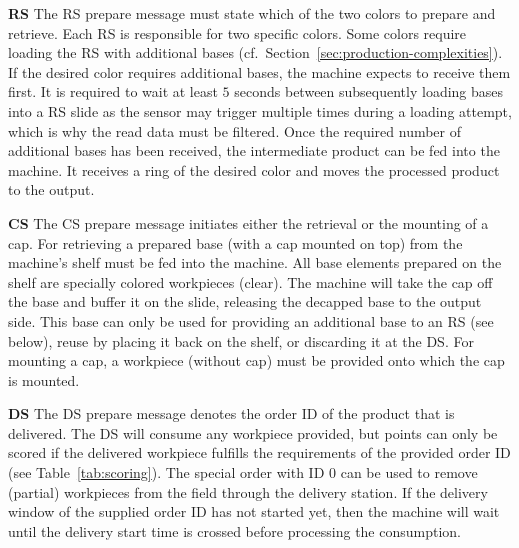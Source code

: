 \documentclass[12pt,twoside]{article}
\newcommand{\refsec}[1]{Section~\ref{#1}}
\newcommand{\reftab}[1]{Table~\ref{#1}}
\begin{document}
\noindent\textbf{\acl{RS}}
The \ac{RS} prepare message must state which of the two colors to prepare and
retrieve. Each \ac{RS} is responsible for two specific colors. Some colors
require loading the \ac{RS} with additional bases
(cf.~\refsec{sec:production-complexities}). If the desired color requires
additional bases, the machine expects to receive them first.
It is required to wait at least $5$ seconds between
subsequently loading bases into a \ac{RS} slide as the sensor may trigger
multiple times during a loading attempt, which is why the read data must be
filtered.
Once the required number of
additional bases has been received, the intermediate product can be
fed into the machine. It receives a ring of the desired color and
moves the processed product to the output.

\noindent\textbf{\acl{CS}}
The \ac{CS} prepare message initiates either the retrieval or the mounting of
a cap. For retrieving a prepared base (with a cap mounted on top) from
the machine's shelf must be fed into the machine. All base elements
prepared on the shelf are specially colored workpieces (clear). The
machine will take the cap off the base and buffer it on the slide,
releasing the decapped base to the output side. This base can only be
used for providing an additional base to an \ac{RS} (see below), reuse by
placing it back on the shelf, or discarding it at the \ac{DS}.  For
mounting a cap, a workpiece (without cap) must be provided onto which
the cap is mounted.

\noindent\textbf{\acl{DS}}
The \ac{DS} prepare message denotes the order ID of the product
that is delivered.
The \ac{DS} will consume any workpiece provided,
but points can only be scored if the delivered workpiece fulfills the
requirements of the provided order ID (see \reftab{tab:scoring}). The special
order with ID 0 can be used to remove (partial) workpieces from the field
through the delivery station.
If the delivery window of the supplied order ID has not started yet, then the
machine will wait until the delivery start time is crossed before processing
the consumption.
\end{document}
